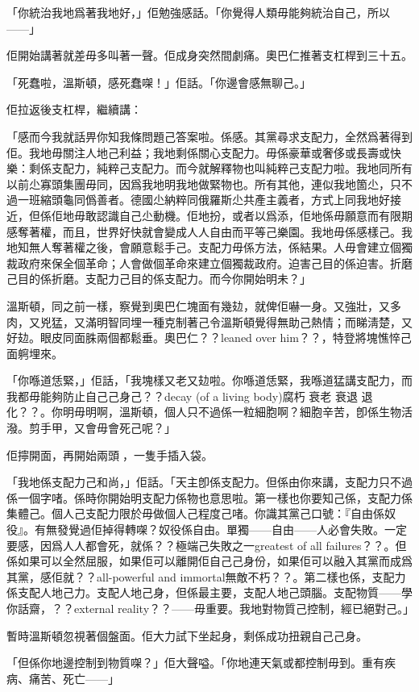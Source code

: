 「你統治我地爲著我地好，」佢勉強感話。「你覺得人類毋能夠統治自己，所以——」

佢開始講著就差毋多叫著一聲。佢成身突然間劇痛。奧巴仁推著支杠桿到三十五。

「死蠢啦，溫斯頓，感死蠢㗎！」佢話。「你邊會感無聊己。」

佢拉返後支杠桿，繼續講：

「感而今我就話畀你知我條問題己答案啦。係感。其黨尋求支配力，全然爲著得到佢。我地毋關注人地己利益；我地剩係關心支配力。毋係豪華或奢侈或長壽或快樂：剩係支配力，純粹己支配力。而今就解釋物也叫純粹己支配力啦。我地同所有以前尐寡頭集團毋同，因爲我地明我地做緊物也。所有其他，連似我地箇尐，只不過一班縮頭龜同僞善者。德國尐納粹同俄羅斯尐共產主義者，方式上同我地好接近，但係佢地毋敢認識自己尐動機。佢地扮，或者以爲添，佢地係毋願意而有限期感奪著權，而且，世界好快就會變成人人自由而平等己樂園。我地毋係感樣己。我地知無人奪著權之後，會願意鬆手己。支配力毋係方法，係結果。人毋會建立個獨裁政府來保全個革命；人會做個革命來建立個獨裁政府。迫害己目的係迫害。折磨己目的係折磨。支配力己目的係支配力。而今你開始明未？」

溫斯頓，同之前一樣，察覺到奧巴仁塊面有幾攰，就俾佢嚇一身。又強壯，又多肉，又兇猛，又滿明智同埋一種克制著己令溫斯頓覺得無助己熱情；而睇淸楚，又好攰。眼皮同面䏭兩個都鬆垂。奧巴仁？？leaned over him？？，特登將塊憔悴己面䠻埋來。

「你喺道恁緊，」佢話，「我塊樣又老又攰啦。你喺道恁緊，我喺道猛講支配力，而我都毋能夠防止自己己身己？？decay (of a living body)腐朽 衰老 衰退 退化？？。你明毋明啊，溫斯頓，個人只不過係一粒細胞啊？細胞辛苦，卽係生物活潑。剪手甲，又會毋會死己呢？」

佢擰開面，再開始兩頭𨆐，一隻手插入袋。

「我地係支配力己和尚，」佢話。「天主卽係支配力。但係由你來講，支配力只不過係一個字啫。係時你開始明支配力係物也意思啦。第一樣也你要知己係，支配力係集體己。個人己支配力限於毋做個人己程度己啫。你識其黨己口號：『自由係奴役』。有無發覺過佢掉得轉㗎？奴役係自由。單獨——自由——人必會失敗。一定要感，因爲人人都會死，就係？？極端己失敗之一greatest of all failures？？。但係如果可以全然屈服，如果佢可以離開佢自己己身份，如果佢可以融入其黨而成爲其黨，感佢就？？all-powerful and immortal無敵不朽？？。第二樣也係，支配力係支配人地己力。支配人地己身，但係最主要，支配人地己頭腦。支配物質——學你話齋，？？external reality？？——毋重要。我地對物質己控制，經已絕對己。」

暫時溫斯頓忽視著個盤面。佢大力試下坐起身，剩係成功扭親自己己身。

「但係你地邊控制到物質㗎？」佢大聲嗌。「你地連天氣或都控制毋到。重有疾病、痛苦、死亡——」

